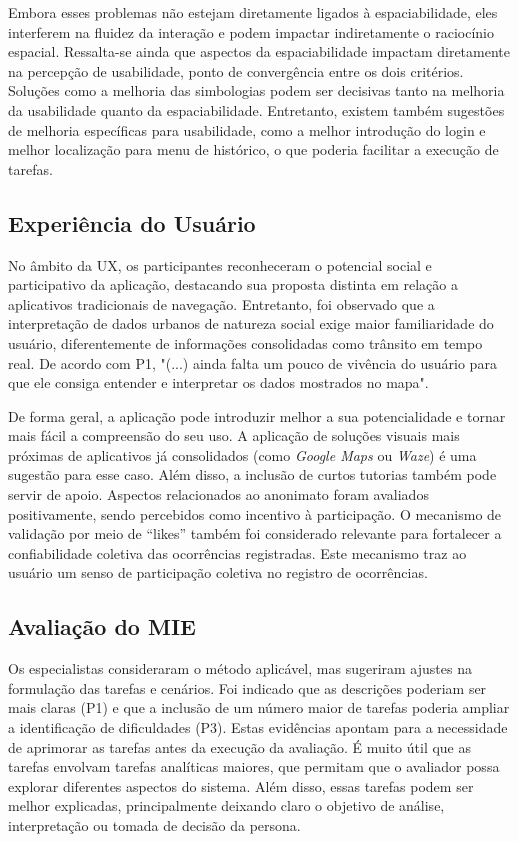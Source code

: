 \documentclass[12pt]{article}
\begin{document}
Embora esses problemas não estejam diretamente ligados à espaciabilidade, eles interferem na fluidez da interação e podem impactar indiretamente o raciocínio espacial. Ressalta-se ainda que aspectos da espaciabilidade impactam diretamente na percepção de usabilidade, ponto de convergência entre os dois critérios. Soluções como a melhoria das simbologias podem ser decisivas tanto na melhoria da usabilidade quanto da espaciabilidade. Entretanto, existem também sugestões de melhoria específicas para usabilidade, como a melhor introdução do login e melhor localização para menu de histórico, o que poderia facilitar a execução de tarefas.

\subsection{Experiência do Usuário}
No âmbito da UX, os participantes reconheceram o potencial social e participativo da aplicação, destacando sua proposta distinta em relação a aplicativos tradicionais de navegação. Entretanto, foi observado que a interpretação de dados urbanos de natureza social exige maior familiaridade do usuário, diferentemente de informações consolidadas como trânsito em tempo real. De acordo com P1, "(...) ainda falta um pouco de vivência do usuário para que ele consiga entender e interpretar os dados mostrados no mapa". 

De forma geral, a aplicação pode introduzir melhor a sua potencialidade e tornar mais fácil a compreensão do seu uso. A aplicação de soluções visuais mais próximas de aplicativos já consolidados (como \textit{Google Maps} ou \textit{Waze}) é uma sugestão para esse caso. Além disso, a inclusão de curtos tutorias também pode servir de apoio. Aspectos relacionados ao anonimato foram avaliados positivamente, sendo percebidos como incentivo à participação. O mecanismo de validação por meio de “likes” também foi considerado relevante para fortalecer a confiabilidade coletiva das ocorrências registradas. Este mecanismo traz ao usuário um senso de participação coletiva no registro de ocorrências.




\subsection{Avaliação do MIE}
Os especialistas consideraram o método aplicável, mas sugeriram ajustes na formulação das tarefas e cenários. Foi indicado que as descrições poderiam ser mais claras (P1) e que a inclusão de um número maior de tarefas poderia ampliar a identificação de dificuldades (P3). Estas evidências apontam para a necessidade de aprimorar as tarefas antes da execução da avaliação. É muito útil que as tarefas envolvam tarefas analíticas maiores, que permitam que o avaliador possa explorar diferentes aspectos do sistema. Além disso, essas tarefas podem ser melhor explicadas, principalmente deixando claro o objetivo de análise, interpretação ou tomada de decisão da persona.
\end{document}
